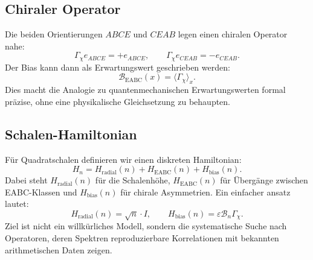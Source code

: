 \documentclass[11pt,a4paper,bibliography=totoc]{scrartcl}
\begin{document}
\subsection{Chiraler Operator}
Die beiden Orientierungen $ABCE$ und $CEAB$ legen einen chiralen Operator nahe:
\[
\Gamma_{\chi} e_{ABCE} = +e_{ABCE}, \qquad \Gamma_{\chi} e_{CEAB} = -e_{CEAB}.
\]
Der Bias kann dann als Erwartungswert geschrieben werden:
\[
\mathcal{B}_{\mathrm{EABC}}(x) = \langle \Gamma_{\chi} \rangle_x.
\]
Dies macht die Analogie zu quantenmechanischen Erwartungswerten formal präzise, ohne eine physikalische Gleichsetzung zu behaupten.

\subsection{Schalen-Hamiltonian}
Für Quadratschalen definieren wir einen diskreten Hamiltonian:
\[
H_n = H_{\mathrm{radial}}(n) + H_{\mathrm{EABC}}(n) + H_{\mathrm{bias}}(n).
\]
Dabei steht $H_{\mathrm{radial}}(n)$ für die Schalenhöhe, $H_{\mathrm{EABC}}(n)$ für Übergänge zwischen EABC-Klassen und $H_{\mathrm{bias}}(n)$ für chirale Asymmetrien. Ein einfacher ansatz lautet:
\[
H_{\mathrm{radial}}(n) = \sqrt{n} \cdot I, \qquad H_{\mathrm{bias}}(n) = \varepsilon \mathcal{B}_n \Gamma_{\chi}.
\]
Ziel ist nicht ein willkürliches Modell, sondern die systematische Suche nach Operatoren, deren Spektren reproduzierbare Korrelationen mit bekannten arithmetischen Daten zeigen.
\end{document}
